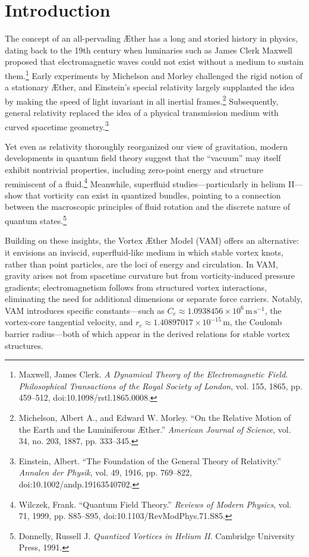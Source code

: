 \documentclass[aps,preprint,superscriptaddress]{revtex4-2}
\begin{document}
    \section{Introduction}
        The concept of an all-pervading Æther has a long and storied history in physics, dating back to the 19th century when luminaries such as James Clerk Maxwell proposed that electromagnetic waves could not exist without a medium to sustain them.\footnote{Maxwell, James Clerk. \textit{A Dynamical Theory of the Electromagnetic Field}. \textit{Philosophical Transactions of the Royal Society of London}, vol. 155, 1865, pp. 459–512, doi:10.1098/rstl.1865.0008.} Early experiments by Michelson and Morley challenged the rigid notion of a stationary Æther, and Einstein’s special relativity largely supplanted the idea by making the speed of light invariant in all inertial frames.\footnote{Michelson, Albert A., and Edward W. Morley. “On the Relative Motion of the Earth and the Luminiferous Æther.” \textit{American Journal of Science}, vol. 34, no. 203, 1887, pp. 333–345.} Subsequently, general relativity replaced the idea of a physical transmission medium with curved spacetime geometry.\footnote{Einstein, Albert. “The Foundation of the General Theory of Relativity.” \textit{Annalen der Physik}, vol. 49, 1916, pp. 769–822, doi:10.1002/andp.19163540702.}

        Yet even as relativity thoroughly reorganized our view of gravitation, modern developments in quantum field theory suggest that the “vacuum” may itself exhibit nontrivial properties, including zero-point energy and structure reminiscent of a fluid.\footnote{Wilczek, Frank. “Quantum Field Theory.” \textit{Reviews of Modern Physics}, vol. 71, 1999, pp. S85–S95, doi:10.1103/RevModPhys.71.S85.} Meanwhile, superfluid studies—particularly in helium II—show that vorticity can exist in quantized bundles, pointing to a connection between the macroscopic principles of fluid rotation and the discrete nature of quantum states.\footnote{Donnelly, Russell J. \textit{Quantized Vortices in Helium II}. Cambridge University Press, 1991.}

        Building on these insights, the Vortex Æther Model (VAM) offers an alternative: it envisions an inviscid, superfluid-like medium in which stable vortex knots, rather than point particles, are the loci of energy and circulation. In VAM, gravity arises not from spacetime curvature but from vorticity-induced pressure gradients; electromagnetism follows from structured vortex interactions, eliminating the need for additional dimensions or separate force carriers. Notably, VAM introduces specific constants—such as $C_e \approx 1.0938456 \times 10^6\,\mathrm{m\,s^{-1}}$, the vortex-core tangential velocity, and $r_c \approx 1.40897017\times 10^{-15}\,\mathrm{m}$, the Coulomb barrier radius—both of which appear in the derived relations for stable vortex structures.
\end{document}
